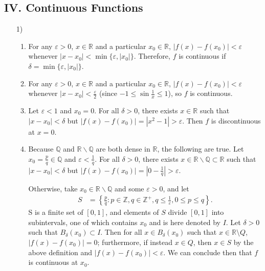 \documentclass[a4paper,12pt]{article}
\begin{document}
    \subsection*{IV. Continuous Functions}
    \begin{enumerate}
        \item[1)]
            \begin{enumerate}
                \item
                    For any $\varepsilon > 0$, $x \in \mathbb{R}$ and a particular $x_0 \in \mathbb{R}$, $|f(x) - f(x_0)| < \varepsilon$ whenever $|x - x_0| < \min\{\varepsilon, |x_0|\}$. Therefore, $f$ is continuous if $\delta = \min\{\varepsilon, |x_0|\}$.
                \item
                    For any $\varepsilon > 0$, $x \in \mathbb{R}$ and a particular $x_0 \in \mathbb{R}$, $|f(x) - f(x_0)| < \varepsilon$ whenever $|x - x_0| < \frac{\varepsilon}{2}$ (since $-1 \leq \sin \frac{1}{x} \leq 1$), so $f$ is continuous.
                \item
                    Let $\varepsilon < 1$ and $x_0 = 0$. For all $\delta > 0$, there exists $x \in \mathbb{R}$ such that $|x - x_0| < \delta$ but $|f(x) - f(x_0)| = |x^2 - 1| > \varepsilon$. Then $f$ is discontinuous at $x = 0$.
                \item
                    Because $\mathbb{Q}$ and $\mathbb{R} \backslash \mathbb{Q}$ are both dense in $\mathbb{R}$, the following are true. Let $x_0 = \frac{p}{q} \in \mathbb{Q}$ and $\varepsilon < \frac{1}{q}$. For all $\delta > 0$, there exists $x \in \mathbb{R} \backslash \mathbb{Q} \subset \mathbb{R}$ such that $|x - x_0| < \delta$ but $|f(x) - f(x_0)| = |0 - \frac{1}{q}| > \varepsilon$. \par
                    Otherwise, take $x_0 \in \mathbb{R} \backslash \mathbb{Q}$ and some $\varepsilon > 0$, and let
                    \begin{align*}
                        S &= \left\{ \frac{p}{q} : p \in \mathbb{Z}, q \in \mathbb{Z}^+, q \leq \frac{1}{\varepsilon}, 0 \leq p \leq q \right\}.
                    \end{align*}
                    S is a finite set of $[0, 1]$, and elements of $S$ divide $[0, 1]$ into subintervals, one of which contains $x_0$ and is here denoted by $I$. Let $\delta > 0$ such that $B_\delta(x_0) \subset I$. Then for all $x \in B_\delta(x_0)$ such that $x \in \mathbb{R} \setminus Q$, $|f(x) - f(x_0)| = 0$; furthermore, if instead $x \in Q$, then $x \in S$ by the above definition and $|f(x) - f(x_0)| < \varepsilon$. We can conclude then that $f$ is continuous at $x_0$.
                    \iffalse
                    then for all $\delta > 0$, there exists $x = \frac{p}{q} \in \mathbb{Q}$ such that $|x - x_0| < \delta$ but $|f(x) - f(x_0)| = |\frac{1}{q} - 0| > \varepsilon$. Then $f$ is discontinuous at every point in the real numbers. 
                    \fi
            \end{enumerate}


\end{enumerate}
\end{document}
